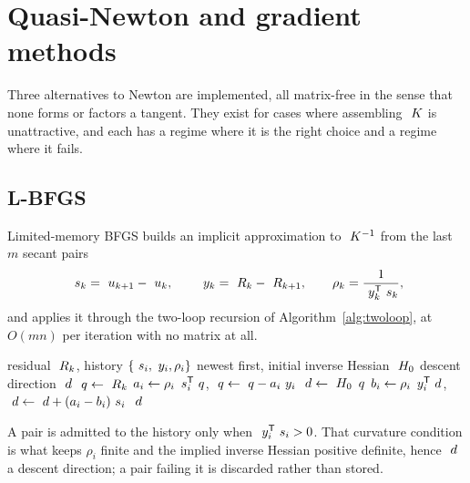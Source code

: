 \chapter{Quasi-Newton and gradient methods}
\label{ch:quasinewton}

Three alternatives to Newton are implemented, all matrix-free in the sense that
none forms or factors a tangent.  They exist for cases where assembling
$~K$ is unattractive, and each has a regime where it is the right choice
and a regime where it fails.

\section{L-BFGS}
\label{sec:lbfgs}

Limited-memory BFGS builds an implicit approximation to $~K^{-1}$ from the
last $m$ secant pairs
\begin{equation}
  ~s_k = ~u_{k+1} - ~u_k,
  \qquad
  ~y_k = ~R_k - ~R_{k+1},
  \qquad
  \rho_k = \frac{1}{~y_k^{\mathsf{T}}~s_k},
\end{equation}
and applies it through the two-loop recursion of
Algorithm~\ref{alg:twoloop}, at $O(mn)$ per iteration with no matrix at all.

\begin{algorithm}[h]
\caption{L-BFGS two-loop recursion}
\label{alg:twoloop}
\begin{algorithmic}[1]
  \Require residual $~R_k$, history $\{~s_i, ~y_i, \rho_i\}$
           newest first, initial inverse Hessian $~H_0$
  \Ensure descent direction $~d$
  \State $~q \gets ~R_k$
    \State $a_i \gets \rho_i\,~s_i^{\mathsf{T}}~q$,\quad
           $~q \gets ~q - a_i~y_i$
  \EndFor
  \State $~d \gets ~H_0\,~q$
    \State $b_i \gets \rho_i\,~y_i^{\mathsf{T}}~d$,\quad
           $~d \gets ~d + (a_i - b_i)~s_i$
  \EndFor
  \State \Return $~d$
\end{algorithmic}
\end{algorithm}

A pair is admitted to the history only when $~y_i^{\mathsf{T}}~s_i
> 0$.  That curvature condition is what keeps $\rho_i$ finite and the implied
inverse Hessian positive definite, hence $~d$ a descent direction; a pair
failing it is discarded rather than stored.

